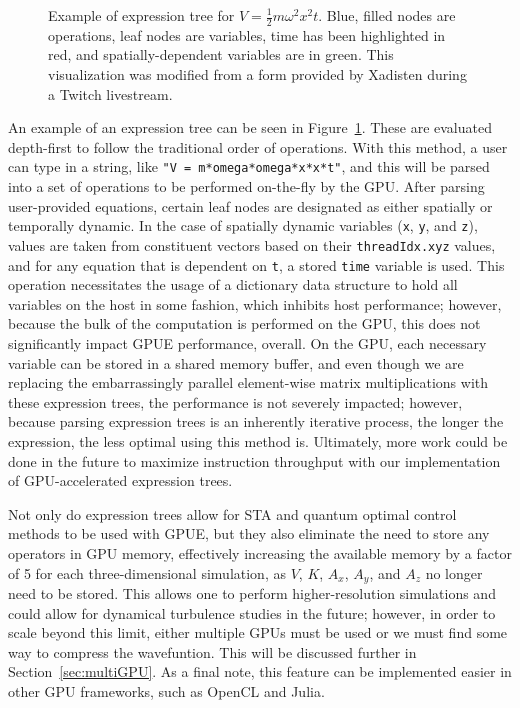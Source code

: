 \begin{figure}
\center 
\caption{
Example of expression tree for $V=\frac{1}{2}m \omega^2 x^2 t$.
Blue, filled nodes are operations, leaf nodes are variables, time has been highlighted in red, and spatially-dependent variables are in green.
This visualization was modified from a form provided by Xadisten during a Twitch livestream.
}
\label{fig:expr_tree}
\end{figure}

An example of an expression tree can be seen in Figure~\ref{fig:expr_tree}.
These are evaluated depth-first to follow the traditional order of operations.
With this method, a user can type in a string, like \texttt{"V = m*omega*omega*x*x*t"}, and this will be parsed into a set of operations to be performed on-the-fly by the GPU.
After parsing user-provided equations, certain leaf nodes are designated as either spatially or temporally dynamic.
In the case of spatially dynamic variables (\texttt{x}, \texttt{y}, and \texttt{z}), values are taken from constituent vectors based on their \texttt{threadIdx.xyz} values, and for any equation that is dependent on \texttt{t}, a stored \texttt{time} variable is used.
This operation necessitates the usage of a dictionary data structure to hold all variables on the host in some fashion, which inhibits host performance; however, because the bulk of the computation is performed on the GPU, this does not significantly impact GPUE performance, overall.
On the GPU, each necessary variable can be stored in a shared memory buffer, and even though we are replacing the embarrassingly parallel element-wise matrix multiplications with these expression trees, the performance is not severely impacted; however,
because parsing expression trees is an inherently iterative process, the longer the expression, the less optimal using this method is.
Ultimately, more work could be done in the future to maximize instruction throughput with our implementation of GPU-accelerated expression trees.

Not only do expression trees allow for STA and quantum optimal control methods to be used with GPUE, but they also eliminate the need to store any operators in GPU memory, effectively increasing the available memory by a factor of 5 for each three-dimensional simulation, as $V$, $K$, $A_x$, $A_y$, and $A_z$ no longer need to be stored.
This allows one to perform higher-resolution simulations and could allow for dynamical turbulence studies in the future; however, in order to scale beyond this limit, either multiple GPUs must be used or we must find some way to compress the wavefuntion.
This will be discussed further in Section~\ref{sec:multiGPU}.
As a final note, this feature can be implemented easier in other GPU frameworks, such as OpenCL and Julia.

